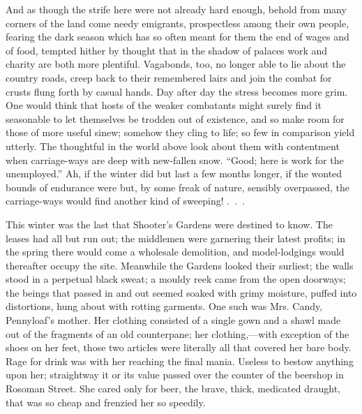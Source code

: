 And as though the strife here were not already hard enough, behold from
many corners of the land come needy emigrants, prospectless among their
own people, fearing the dark season which has so often meant for them
the end of wages and of food, tempted hither by thought that in the
shadow of palaces work and charity are both more plentiful. Vagabonds,
too, no longer able to lie about the country roads, creep back to their
remembered lairs and join the combat for crusts flung forth by casual
hands. Day after day the stress becomes more grim. One would think that
hosts of the weaker combatants might surely find it seasonable to let
themselves be trodden out of existence, and so make room for those of
more useful sinew; somehow they cling to life; so few in comparison
yield utterly. The thoughtful in the world above look about them with
contentment when carriage-ways are deep
{\protect\hypertarget{3}{}{}}with new-fallen snow. ``Good; here is work
for the unemployed.'' Ah, if the winter did but last a few months
longer, if the wonted bounds of endurance were but, by some freak of
nature, sensibly overpassed, the carriage-ways would find another kind
of {sweeping! {.~.~.}}

This winter was the last that Shooter's Gardens were destined to know.
The leases had all but run out; the middlemen were garnering their
latest profits; in the spring there would come a wholesale demolition,
and model-lodgings would thereafter occupy the site. Meanwhile the
Gardens looked their surliest; the walls stood in a perpetual black
sweat; a mouldy reek came from the open doorways; the beings that passed
in and out seemed soaked with grimy moisture, puffed into distortions,
hung about with rotting garments. One such was Mrs. Candy, Pennyloaf's
mother. Her clothing consisted of a single gown and a shawl made out of
the fragments of an old counterpane; her clothing,---with exception of
the shoes on her feet, those two articles were literally all that
covered her bare body. Rage for drink was with her reaching the final
mania. Useless to bestow anything {\protect\hypertarget{4}{}{}}upon her;
straightway it or its value passed over the counter of the beershop in
Rosoman Street. She cared only for beer, the brave, thick, medicated
draught, that was so cheap and frenzied her so speedily.

